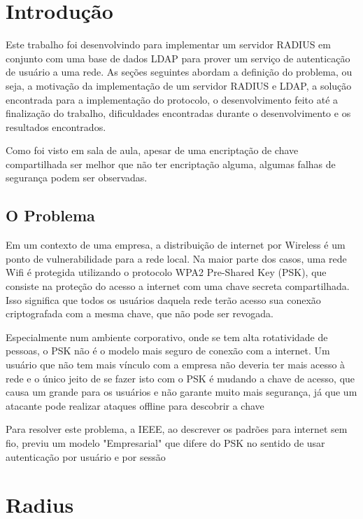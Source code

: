\section{Introdução}

Este trabalho foi desenvolvindo para implementar um servidor RADIUS em conjunto com uma
base de dados LDAP para prover um serviço de autenticação de usuário a uma rede.
As seções seguintes abordam a definição do problema, ou seja, a motivação da implementação
de um servidor RADIUS e LDAP, a solução encontrada para a implementação do protocolo, o
desenvolvimento feito até a finalização do trabalho, dificuldades encontradas durante o
desenvolvimento e os resultados encontrados.

Como foi visto em sala de aula, apesar de uma encriptação de chave compartilhada
ser melhor que não ter encriptação alguma, algumas falhas de segurança podem ser
observadas.


\subsection{O Problema}

Em um contexto de uma empresa, a distribuição de internet por Wireless é um ponto de
vulnerabilidade para a rede local. Na maior parte dos casos, uma rede Wifi é protegida
utilizando o protocolo WPA2 Pre-Shared Key (PSK), que consiste na proteção do acesso a internet com uma
chave secreta compartilhada. Isso significa que todos os usuários daquela rede terão acesso
sua conexão criptografada com a mesma chave, que não pode ser revogada. \cite{freeradius}

Especialmente num ambiente corporativo, onde se tem alta rotatividade de pessoas,
o PSK não é o modelo mais seguro de conexão com a internet. Um usuário que não tem
mais vínculo com a empresa não deveria ter mais acesso à rede e o único jeito de se
fazer isto com o PSK é mudando a chave de acesso, que causa um grande 
para os usuários e não garante muito mais segurança, já que um atacante pode realizar
ataques offline para descobrir a chave \cite{freeradius}

Para resolver este problema, a IEEE, ao descrever os padrões para internet sem fio,
previu um modelo "Empresarial" que difere do PSK no sentido de usar autenticação
por usuário e por sessão \cite{freeradius}

\section{Radius}

